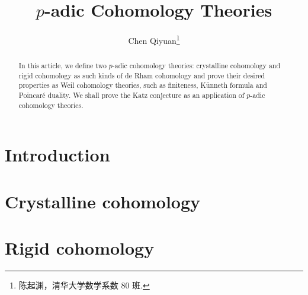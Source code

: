 \documentclass[twoside]{article}
\begin{document}
\title{$p$-adic Cohomology Theories}
\author{Chen Qiyuan\footnote{陈起渊，清华大学数学系数 80 班.}}

\tableofcontents

\begin{abstract}
    In this article, we define two $p$-adic cohomology theories:
    crystalline cohomology and rigid cohomology as such kinds of de Rham cohomology 
    and prove their desired properties as Weil cohomology theories, 
    such as finiteness, K\"unneth formula and Poincar\'e duality. 
    We shall prove the Katz conjecture as an application of $p$-adic cohomology theories. 
\end{abstract}

\section{Introduction}



\section{Crystalline cohomology}



\section{Rigid cohomology}



\printbibliography
\end{document}
